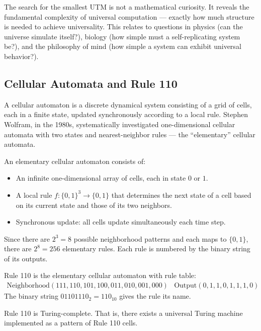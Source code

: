 The search for the smallest UTM is not a mathematical curiosity. It reveals the fundamental complexity of universal computation --- exactly how much structure is needed to achieve universality. This relates to questions in physics (can the universe simulate itself?), biology (how simple must a self-replicating system be?), and the philosophy of mind (how simple a system can exhibit universal behavior?).

\subsection{Cellular Automata and Rule 110}
\label{sec:computation:ca}

A cellular automaton is a discrete dynamical system consisting of a grid of cells, each in a finite state, updated synchronously according to a local rule. Stephen Wolfram, in the 1980s, systematically investigated one-dimensional cellular automata with two states and nearest-neighbor rules --- the ``elementary'' cellular automata.

\begin{definition}
An elementary cellular automaton consists of:
\begin{itemize}
\item An infinite one-dimensional array of cells, each in state $0$ or $1$.
\item A local rule $f: \{0,1\}^3 \to \{0,1\}$ that determines the next state of a cell based on its current state and those of its two neighbors.
\item Synchronous update: all cells update simultaneously each time step.
\end{itemize}
Since there are $2^3 = 8$ possible neighborhood patterns and each maps to $\{0,1\}$, there are $2^8 = 256$ elementary rules. Each rule is numbered by the binary string of its outputs.
\end{definition}

\begin{example}[Rule 110]
Rule 110 is the elementary cellular automaton with rule table:
\[
\begin{array}{c|c}
\text{Neighborhood} (111, 110, 101, 100, 011, 010, 001, 000) & \text{Output} (0,1,1,0,1,1,1,0)
\end{array}
\]
The binary string $01101110_2 = 110_{10}$ gives the rule its name.
\end{example}

\begin{theorem}[Cook 2004]
Rule 110 is Turing-complete. That is, there exists a universal Turing machine implemented as a pattern of Rule 110 cells.
\end{theorem}


